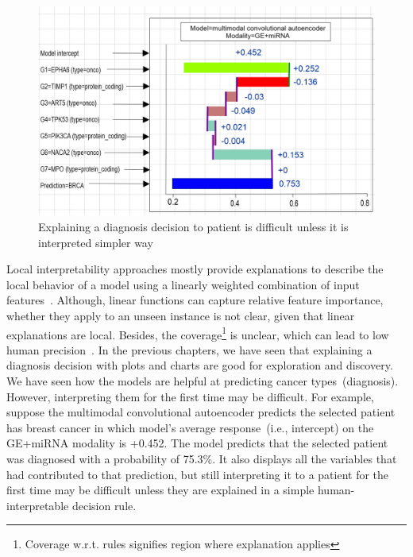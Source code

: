 \begin{figure}[h]
	\centering
		\includegraphics[scale=0.6]{images/intercept.png}
	    \caption{Explaining a diagnosis decision to patient is difficult unless it is interpreted simpler way}
	    \label{problem_of_xai:1}
\end{figure}

\hspace*{3.5mm} Local interpretability approaches mostly provide explanations to describe the local behavior of a model using a linearly weighted combination of input features~\cite{baehrens2010explain}. Although, linear functions can capture relative feature importance, whether they apply to an unseen instance is not clear, given that linear explanations are local. Besides, the coverage\footnote{Coverage w.r.t. rules signifies region where explanation applies} is unclear, which can lead to low human precision~\cite{ribeiro2018anchors}. 
In the previous chapters, we have seen that explaining a diagnosis decision with plots and charts are good for exploration and discovery. We have seen how the models are helpful at predicting cancer types~(diagnosis). However, interpreting them for the first time may be difficult. For example, suppose the multimodal convolutional autoencoder predicts the selected patient has breast cancer in which model's average response~(i.e., intercept) on the GE+miRNA modality is +0.452. The model predicts that the selected patient was diagnosed with a probability of 75.3\%. It also displays all the variables that had contributed to that prediction, but still interpreting it to a patient for the first time may be difficult unless they are explained in a simple human-interpretable decision rule.  

